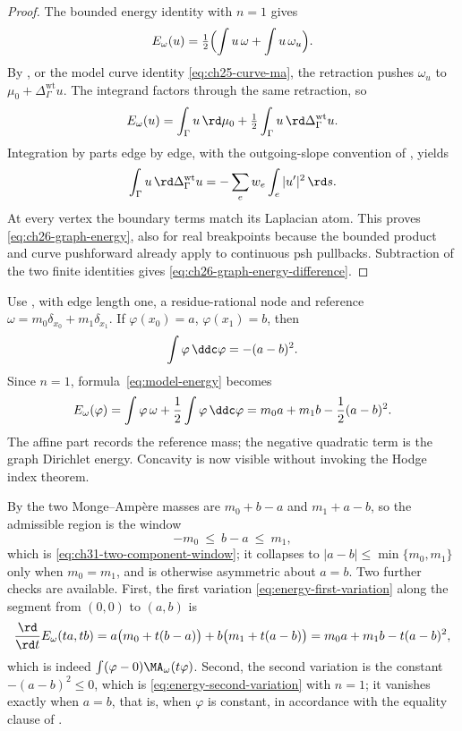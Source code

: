 \begin{proof}
The bounded energy identity with $n=1$ gives
\[
 E_\omega(u)=\tfrac12\Bigl(\int u\,\omega+\int u\,\omega_u\Bigr).
\]
By , or the model curve identity
\eqref{eq:ch25-curve-ma}, the retraction pushes $\omega_u$ to
$\mu_0+\Delta_\Gamma^{\mathrm{wt}}u$.  The integrand factors through
the same retraction, so
\[
 E_\omega(u)=\int_\Gamma u\,\rd\mu_0
             +\tfrac12\int_\Gamma u\,\rd\Delta_\Gamma^{\mathrm{wt}}u.
\]
Integration by parts edge by edge, with the outgoing-slope convention of
, yields
\[
 \int_\Gamma u\,\rd\Delta_\Gamma^{\mathrm{wt}}u
 =-\sum_e w_e\int_e|u'|^2\,\rd s.
\]
At every vertex the boundary terms match its Laplacian atom.  This proves
\eqref{eq:ch26-graph-energy}, also for real breakpoints because the
bounded product and curve pushforward already apply to continuous psh
pullbacks.  Subtraction of the two finite identities gives
\eqref{eq:ch26-graph-energy-difference}.
\end{proof}

\begin{example}
\label{ex:ch26-two-vertex-energy}
Use , with edge length one, a residue-rational node and reference
$\omega=m_0\delta_{x_0}+m_1\delta_{x_1}$. If
$\varphi(x_0)=a$, $\varphi(x_1)=b$, then
\[
 \int\varphi\,\ddc\varphi=-(a-b)^2.
\]
Since $n=1$, formula~\eqref{eq:model-energy} becomes
\[
 E_\omega(\varphi)
 =\int\varphi\,\omega+\frac12\int\varphi\,\ddc\varphi
 =m_0a+m_1b-\frac12(a-b)^2.
\]
The affine part records the reference mass; the negative quadratic term is
the graph Dirichlet energy. Concavity is now visible without invoking the
Hodge index theorem.

By  the two Monge--Amp\`ere masses are
$m_0+b-a$ and $m_1+a-b$, so the admissible region is the window
\[
 -m_0\ \leq\ b-a\ \leq\ m_1 ,
\]
which is \eqref{eq:ch31-two-component-window}; it collapses to
$|a-b|\leq\min\{m_0,m_1\}$ only when $m_0=m_1$, and is otherwise
asymmetric about $a=b$.  Two further checks are available.  First, the
first variation \eqref{eq:energy-first-variation} along the segment from
$(0,0)$ to $(a,b)$ is
\[
 \frac{\rd}{\rd t}E_\omega(ta,tb)
 =a\bigl(m_0+t(b-a)\bigr)+b\bigl(m_1+t(a-b)\bigr)
 =m_0a+m_1b-t(a-b)^2,
\]
which is indeed $\int(\varphi-0)\MA_\omega(t\varphi)$.  Second, the second
variation is the constant $-(a-b)^2\leq0$, which is
\eqref{eq:energy-second-variation} with $n=1$; it vanishes exactly when
$a=b$, that is, when $\varphi$ is constant, in accordance with the
equality clause of .
\end{example}

